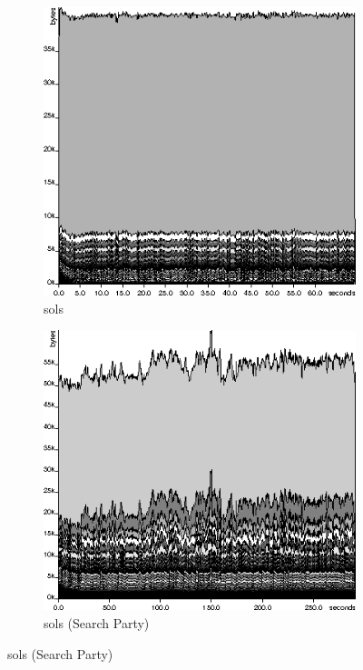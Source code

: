\begin{figure}[t]
  \begin{subfigure}{0.4\textwidth}
    \includegraphics[width=\textwidth]{space/sols-orig}
    \caption{sols}
    \label{fig:searchparty-examples-space:sols-orig}
  \end{subfigure}
  \begin{subfigure}{0.4\textwidth}
    \includegraphics[width=\textwidth]{space/sols-sp}
    \caption{sols (Search Party)}
    \label{fig:searchparty-examples-space:sols-sp}
  \end{subfigure}


\end{figure}
